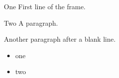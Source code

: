 \documentclass{beamer}
\begin{document}
\begin{frame}{One}
First line of the frame.
\undefinedD
\end{frame}
\begin{frame}{Two}
A paragraph.

Another paragraph after a blank line.

\begin{itemize}
\item one
\item two \undefinedE
\end{itemize}
\end{frame}
\end{document}
